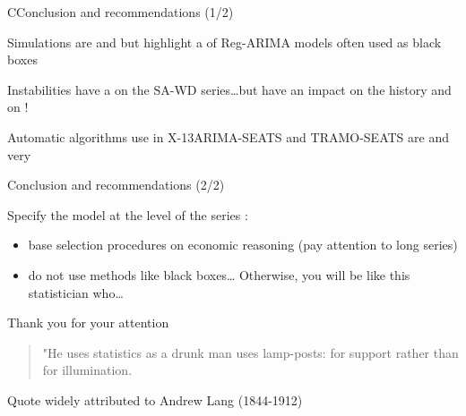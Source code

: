 \documentclass[10pt,xcolor=table,color={dvipsnames,usenames},ignorenonframetext,usepdftitle=false,french]{beamer}
\begin{document}
\begin{frame}{CConclusion and recommendations (1/2)}

\medskip

\bcinfo Simulations are  and
 but highlight a
 of Reg-ARIMA models often
used as black boxes

\medskip  \pause
\bcsmbh Instabilities have a  on the
SA-WD series\dots \bcsmmh but have an impact on the
 history and on
 !

\medskip  \pause
\bcattention Automatic algorithms use in X-13ARIMA-SEATS and TRAMO-SEATS
are  and very

\end{frame}

\begin{frame}{Conclusion and recommendations (2/2)}

Specify the model  at the level of the series
:

\begin{itemize}
\item
  base selection procedures on economic reasoning (pay attention to long
  series)
\item
  \bcinterdit do not use methods like black boxes\ldots{}
  \pause Otherwise, you will be like this statistician who\ldots{}
\end{itemize}

\end{frame}

\begin{frame}{Thank you for your attention}

\begin{quote}
"He uses statistics as a drunk man uses lamp-posts: for support rather than for illumination.
\end{quote}

Quote widely attributed to Andrew Lang (1844-1912)

\addtocounter{framenumber}{-1}

\end{frame}
\end{document}
